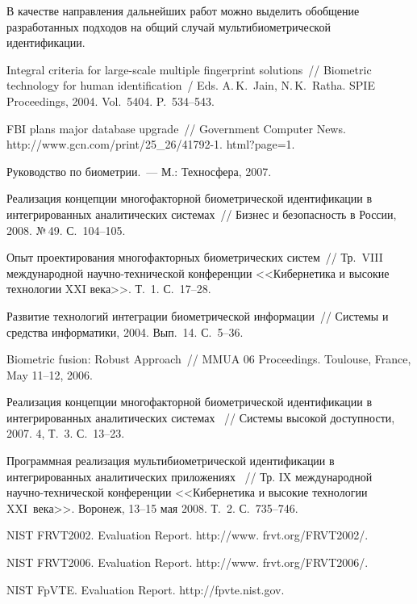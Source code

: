 \begin{multicols}{2}
     В качестве направления дальнейших работ можно выделить обобщение
разработанных подходов на общий случай мультибиометрической идентифи\-кации.

\vspace*{-6pt}

{\small\frenchspacing
{%
\begin{thebibliography}{99}

Integral criteria for large-scale multiple fingerprint solutions~//
Biometric technology for human identification~/ Eds. A.\,K.~Jain,
N.\,K.~Ratha.  SPIE Proceedings, 2004.
Vol.~5404. P.~534--543.

FBI plans major database upgrade~// Government Computer News. 
{\sf http://www.gcn.com/print/25\_26/41792-1.} {\sf html?page=1}.


 Руководство по биометрии.~--- М.: Техносфера, 2007.
 
Реализация концепции многофакторной биометрической
идентификации в интегрированных аналитических системах~//
Бизнес и безопас\-ность в России,  2008. №\,49. С.~104--105.

Опыт проектирования многофакторных биометрических систем~//
Тр.\ \mbox{VIII} международной научно-технической конференции
<<Кибернетика и высокие
технологии XXI века>>. Т.~1. С.~17--28.

Развитие технологий интеграции биометрической
информации~// Системы и средства информатики, 2004. Вып.~14. С.~5--36.

Biometric fusion: Robust Approach~// MMUA 06 Proceedings. Toulouse, France,
May 11--12, 2006. 

Реализация концепции многофакторной биометрической
идентификации в интегрированных аналитических системах~ //
Системы высокой доступности, 2007. 4,  Т.~3. С.~13--23.

Программная реализация мультибиометрической идентификации в
интегрированных аналитических приложениях~ // Тр. IX международной научно-технической
конференции <<Кибернетика и высокие технологии XXI~века>>.
Воронеж, 13--15 мая 2008. Т.~2. С.~735--746.

NIST FRVT2002. Evaluation Report. {\sf
http://www.} {\sf frvt.org/FRVT2002/}.

NIST FRVT2006. Evaluation Report. {\sf
http://www.} {\sf frvt.org/FRVT2006/}.

\label{end\stat}

NIST FpVTE. Evaluation Report.  {\sf
http://fpvte.nist.gov}.
\end{thebibliography}

}
}
\end{multicols}